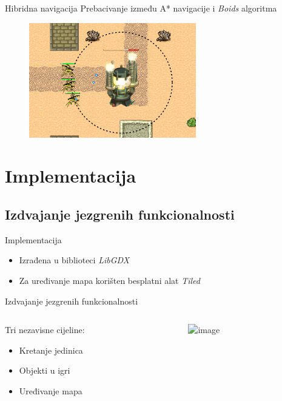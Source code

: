 \documentclass[utf8]{beamer}
\begin{document}
\begin{frame}{Hibridna navigacija}
    Prebacivanje između A* navigacije i \textit{Boids} algoritma
    \begin{figure}[h]
        \centering
        \includegraphics[height=5cm]{images/boidsEnemySeparation.pdf}
    \end{figure}
\end{frame}

\section{Implementacija}

\subsection{Izdvajanje jezgrenih funkcionalnosti}

\begin{frame}{Implementacija}
    \begin{itemize}
        \item Izrađena u biblioteci \textit{LibGDX}
        \item Za uređivanje mapa korišten besplatni alat \textit{Tiled}
    \end{itemize}    
\end{frame}

\begin{frame}{Izdvajanje jezgrenih funkcionalnosti}
    \begin{columns}[c]
        \begin{column}{0.35\textwidth}
            Tri nezavisne cijeline:
            \begin{itemize}
                \item<1-> Kretanje jedinica
                \item<2-> Objekti u igri
                \item<3-> Uređivanje mapa
            \end{itemize}
        \end{column}

        \begin{column}{0.65\textwidth}
            \includegraphics<2->[width=1.0\textwidth]{images/umlObjects.png}
        \end{column}
    \end{columns}
\end{frame}
\end{document}
